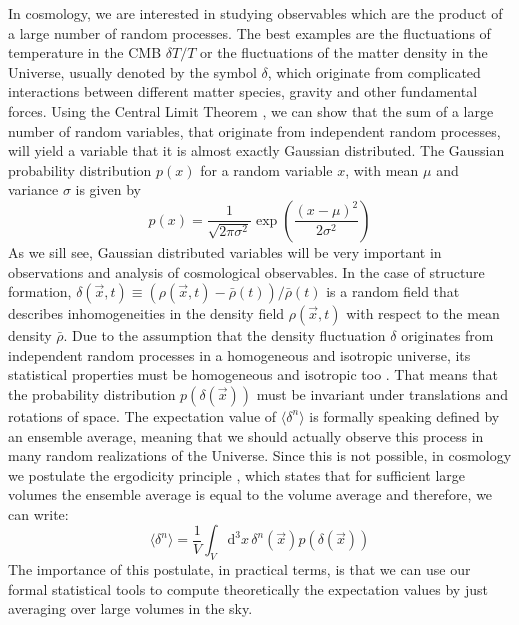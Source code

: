In cosmology, we are interested in studying observables which are the product of a large number of random processes.
The best examples are the fluctuations of temperature in the CMB $\delta T / T$ or the fluctuations of the matter density in the Universe, 
usually denoted by the symbol $\delta$, which originate from complicated interactions between different matter species, gravity and other fundamental forces.
Using the Central Limit Theorem \cite{(cite...)}, we can show that the sum of a large number of random variables, that originate from independent random processes, will yield a variable that it is almost exactly Gaussian distributed. The Gaussian probability distribution $p(x)$ for a random variable $x$, with mean $\mu$ and variance $\sigma$ is given by
\begin{equation}
p(x) = \frac{1}{\sqrt{2 \pi \sigma^2}}\exp\left( \frac{(x-\mu)^2}{2\sigma^2} \right)
\end{equation}
As we sill see, Gaussian distributed variables will be very important in observations and analysis of cosmological observables.
In the case of structure formation, 
\beeqc$
\delta(\vec{x}, t) \equiv (\rho(\vec{x}, t) - \bar{\rho}(t))/\bar{\rho}(t) $
is a random field that describes inhomogeneities in the density field $\rho(\vec x, t)$ with respect to the mean density $\bar\rho$. 
Due to the 
assumption that the density fluctuation $\delta$ originates from independent random processes in a homogeneous and isotropic universe,
its statistical properties must be homogeneous and isotropic too \cite{(cite...Peacock, Bjoern, ?)}.
That means that the probability distribution $p(\delta(\vec{x}))$ must be invariant under translations and rotations of space.
The expectation value of $\langle \delta^n \rangle$ is formally speaking defined by an ensemble average, meaning that
we should actually observe this process in many random realizations of the Universe. Since this is not possible,
in cosmology we postulate the ergodicity principle \cite{(cite Adler...)}, which states that for sufficient large volumes
the ensemble average is equal to the volume average and therefore, we can write:
\begin{equation}
\langle \delta^n \rangle = \frac{1}{V} \int_V \mathrm{d}^3 x \, \delta^n (\vec{x}) p(\delta (\vec{x}))
\end{equation} 
The importance of this postulate, in practical terms, is that we can use our formal statistical tools 
to compute theoretically the expectation values by 
just averaging over large volumes in the sky.

